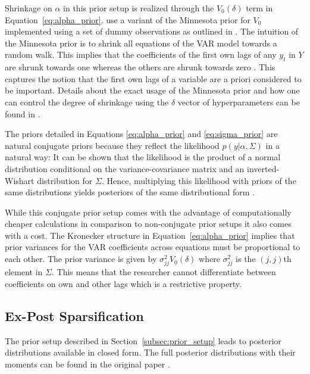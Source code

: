 Shrinkage on $\alpha$ in this prior setup is realized through the $V_0(\delta)$ term in Equation~\eqref{eq:alpha_prior}. \textcite{hauzenberger_combining_2021} use a variant of the Minnesota prior for $V_0$ implemented using a set of dummy observations as outlined in \textcite{banbura_large_2010}. The intuition of the Minnesota prior is to shrink all equations of the VAR model towards a random walk. This implies that the coefficients of the first own lags of any $y_t$ in $Y$ are shrunk towards one whereas the others are shrunk towards zero \parencite{banbura_large_2010,koop_forecasting_2013,kadiyala_numerical_1997}. This captures the notion that the first own lags of a variable are a priori considered to be important. Details about the exact usage of the Minnesota prior and how one can control the degree of shrinkage using the $\delta$ vector of hyperparameters can be found in \textcite[p.~306]{hauzenberger_combining_2021}.

The priors detailed in Equations \eqref{eq:alpha_prior} and \eqref{eq:sigma_prior} are natural conjugate priors because they reflect the likelihood $p(y | \alpha , \Sigma)$ in a natural way: It can be shown that the likelihood is the product of a normal distribution conditional on the variance-covariance matrix and an inverted-Wishart distribution for $\Sigma$. Hence, multiplying this likelihood with priors of the same distributions yields posteriors of the same distributional form \parencite{kadiyala_numerical_1997,koop_bayesian_2009}.

While this conjugate prior setup comes with the advantage of computationally cheaper calculations in comparison to non-conjugate prior setups it also comes with a cost. The Kronecker structure in Equation~\eqref{eq:alpha_prior} implies that prior variances for the VAR coefficients across equations must be proportional to each other. The prior variance is given by $\sigma^2_{jj} V_0(\delta)$ where $\sigma^2_{jj}$ is the $(j, j)$th element in $\Sigma$. This means that the researcher cannot differentiate between coefficients on own and other lags which is a restrictive property.

\subsection{Ex-Post Sparsification}
The prior setup described in Section~\ref{subsec:prior_setup} leads to posterior distributions available in closed form. The full posterior distributions with their moments can be found in the original paper \parencite[p.~307]{hauzenberger_combining_2021}.


